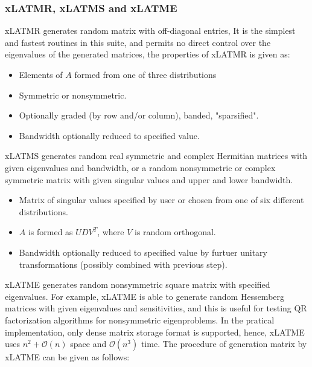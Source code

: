 \subsubsection{xLATMR, xLATMS and xLATME}

xLATMR generates random matrix with off-diagonal entries,  It is the simplest and fastest routines in this suite, and permits no direct control over the eigenvalues of the generated matrices, the properties of xLATMR is given as:

\begin{itemize}
	\item Elements of $A$ formed from one of three distributions
	\item Symmetric or nonsymmetric.
	\item Optionally graded (by row and/or column), banded, "sparsified".
	\item Bandwidth optionally reduced to specified value.
\end{itemize}

xLATMS generates random real symmetric and complex Hermitian matrices with given eigenvalues and bandwidth, or a random nonsymmetric or complex symmetric matrix with given singular values and upper and lower bandwidth.

\begin{itemize}
	\item Matrix of singular values specified by user or chosen from one of six different distributions.
	\item $A$ is formed as $UDV^T$, where $V$ is random orthogonal.
	\item Bandwidth optionally reduced to specified value by furtuer unitary transformations (possibly combined with previous step).
\end{itemize}

xLATME generates random nonsymmetric square matrix with specified eigenvalues. For example, xLATME is able to generate random Hessemberg matrices with given eigenvalues and sensitivities, and this is useful for testing QR factorization algorithms for nonsymmetric eigenproblems. In the pratical implementation, only dense matrix storage format is supported, hence, xLATME uses $n^2+\mathcal{O}(n)$ space and $\mathcal{O}(n^3)$ time. The procedure of generation matrix by xLATME can be given as follows:

